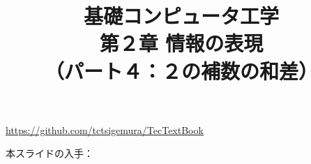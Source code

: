 \documentclass[handout]{beamer}        %
\begin{document}
\title{基礎コンピュータ工学\\第２章 情報の表現\\
       （パート４：２の補数の和差）}
\date{}

\begin{frame}
  \titlepage
  \centerline{\url{https://github.com/tctsigemura/TecTextBook}}
  \vfill
  \centerline{本スライドの入手：
    }
\end{frame}

\end{document}
